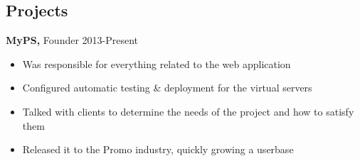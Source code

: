 \documentclass[line, centered]{res}
\begin{document}
\begin{resume}
\section{Projects}
{\bf MyPS,} Founder     \hfill 2013-Present
\begin{itemize} \itemsep -2pt
   \item Was responsible for everything related to the web application
   \item Configured automatic testing \& deployment for the virtual servers
   \item Talked with clients to determine the needs of the project and how to satisfy them
   \item Released it to the Promo industry, quickly growing a userbase
\end{itemize}

\end{resume}
\end{document}
